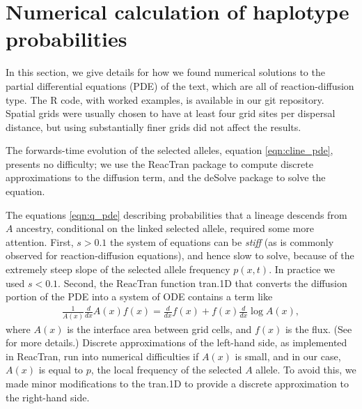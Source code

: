 \documentclass[11pt,letterpaper]{article}
\begin{document}
\section{Numerical calculation of haplotype probabilities}
\label{apx:haplotype_calcs}

In this section, we give details for how we found numerical solutions
to the partial differential equations (PDE) of the text,
which are all of reaction-diffusion type.
The R code, with worked examples, is available in our git repository.
Spatial grids were usually chosen to have at least four grid sites per dispersal distance,
but using substantially finer grids did not affect the results.

The forwards-time evolution of the selected alleles,
equation \eqref{eqn:cline_pde}, presents no difficulty;
we use the ReacTran package \citep{soetaert2012reactive} to compute discrete approximations to the diffusion term,
and the deSolve package \citep{soetaert2010solving} to solve the equation.

The equations \eqref{eqn:q_pde} describing probabilities that a lineage descends from $A$ ancestry,
conditional on the linked selected allele, required some more attention.
First, $s>0.1$ the system of equations can be \emph{stiff} 
(as is commonly observed for reaction-diffusion equations),
and hence slow to solve,
because of the extremely steep slope of the selected allele frequency $p(x,t)$.
In practice we used $s<0.1$.
Second, the ReacTran function tran.1D that converts the diffusion portion of the PDE into a system of ODE
contains a term like 
\begin{align*}
    \frac{1}{A(x)} \frac{d}{dx} A(x) f(x) = \frac{d}{dx} f(x) + f(x) \frac{d}{dx} \log A(x) ,
\end{align*}
where $A(x)$ is the interface area between grid cells, and $f(x)$ is the flux.
(See \citet{soetaert2012reactive} for more details.)
Discrete approximations of the left-hand side, as implemented in ReacTran, 
run into numerical difficulties if $A(x)$ is small,
and in our case, $A(x)$ is equal to $p$, the local frequency of the selected $A$ allele.
To avoid this, we made minor modifications to the tran.1D to provide a discrete approximation to the right-hand side.
\end{document}
